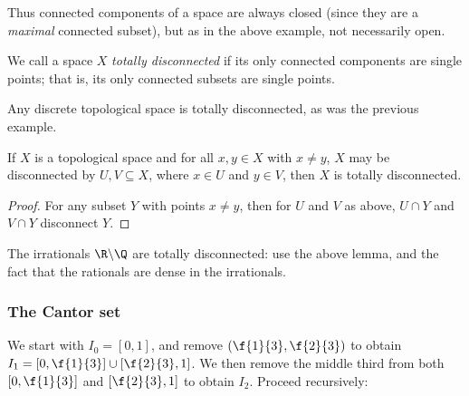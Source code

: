 \vspace{3pt}

\begin{remark}
	Thus connected components of a space are always closed (since they are a \emph{maximal} connected subset), but as in the above example, not necessarily open.
\end{remark}

\begin{definition}
	We call a space $X$ \emph{totally disconnected} if its only connected components are single points; that is, its only connected subsets are single points.
\end{definition}

Any discrete topological space is totally disconnected, as was the previous example.

\begin{lemma}
	If $X$ is a topological space and for all $x,y\in X$ with $x\neq y$, $X$ may be disconnected by $U,V\subseteq X$, where $x\in U$ and $y\in V$, then $X$ is totally disconnected. \label{lem:trivial}
\end{lemma}

\begin{proof}
	For any subset $Y$ with points $x\neq y$, then for $U$ and $V$ as above, $U\cap Y$ and $V\cap Y$ disconnect $Y$. %
\end{proof}

The irrationals $\R\backslash\Q$ are totally disconnected: use the above lemma, and the fact that the rationals are dense in the irrationals.


\subsubsection*{The Cantor set} %
\label{ssub:the_cantor_set}

We start with $I_0=[0,1]$, and remove $(\f{1}{3},\f{2}{3})$ to obtain $I_1 = [0,\f{1}{3}] \cup [\f{2}{3},1]$. We then remove the middle third from both $[0,\f{1}{3}]$ and $[\f{2}{3},1]$ to obtain $I_2$. Proceed recursively:

